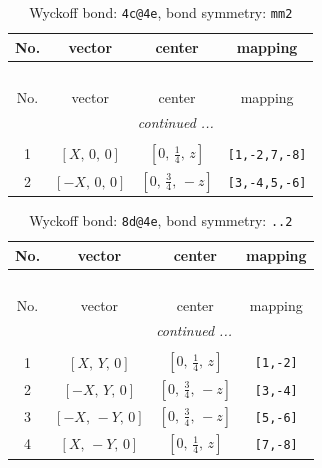 \documentclass[fleqn,8pt]{jsarticle}
\begin{document}
\begin{longtable}{cccc}
\caption{Wyckoff bond: {\tt 4c@4e}, bond symmetry: {\tt mm2}}
 \\
 \hline \hline
No. & vector & center & mapping \\ \hline \endfirsthead

\multicolumn{3}{l}{\tablename\ \thetable{}} \\
 \hline \hline
No. & vector & center & mapping \\ \hline \endhead

 \hline \hline
\multicolumn{3}{r}{\footnotesize\it continued ...} \\ \endfoot

 \hline \hline
\multicolumn{3}{r}{} \\ \endlastfoot

1 & $\left[ X,\, 0,\, 0 \right]$ & $\left[ 0,\, \frac{1}{4},\, z \right]$ & {\tt [1,-2,7,-8]} \\ \hline
2 & $\left[ - X,\, 0,\, 0 \right]$ & $\left[ 0,\, \frac{3}{4},\, - z \right]$ & {\tt [3,-4,5,-6]} \\
\end{longtable}
\renewcommand{\arraystretch}{1.2}
\begin{longtable}{cccc}
\caption{Wyckoff bond: {\tt 8d@4e}, bond symmetry: {\tt ..2}}
 \\
 \hline \hline
No. & vector & center & mapping \\ \hline \endfirsthead

\multicolumn{3}{l}{\tablename\ \thetable{}} \\
 \hline \hline
No. & vector & center & mapping \\ \hline \endhead

 \hline \hline
\multicolumn{3}{r}{\footnotesize\it continued ...} \\ \endfoot

 \hline \hline
\multicolumn{3}{r}{} \\ \endlastfoot

1 & $\left[ X,\, Y,\, 0 \right]$ & $\left[ 0,\, \frac{1}{4},\, z \right]$ & {\tt [1,-2]} \\ \hline
2 & $\left[ - X,\, Y,\, 0 \right]$ & $\left[ 0,\, \frac{3}{4},\, - z \right]$ & {\tt [3,-4]} \\ \hline
3 & $\left[ - X,\, - Y,\, 0 \right]$ & $\left[ 0,\, \frac{3}{4},\, - z \right]$ & {\tt [5,-6]} \\ \hline
4 & $\left[ X,\, - Y,\, 0 \right]$ & $\left[ 0,\, \frac{1}{4},\, z \right]$ & {\tt [7,-8]} \\
\end{longtable}
\end{document}
